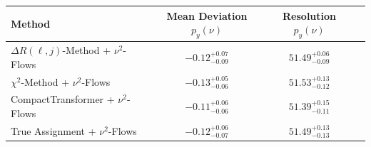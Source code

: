    \begin{tabular}{lccc}
        \toprule
        Method & Mean Deviation $p_{y}(\nu)$ & Resolution $p_{y}(\nu)$ \\
        \midrule
        $\Delta R(\ell,j)$-Method + $\nu^2$-Flows & $-0.12^{+0.07}_{-0.09}$ & $51.49^{+0.06}_{-0.09}$ \\
        $\chi^2$-Method + $\nu^2$-Flows & $-0.13^{+0.05}_{-0.06}$ & $51.53^{+0.13}_{-0.12}$ \\
        CompactTransformer + $\nu^2$-Flows & $-0.11^{+0.06}_{-0.06}$ & $51.39^{+0.15}_{-0.11}$ \\
        True Assignment + $\nu^2$-Flows & $-0.12^{+0.06}_{-0.07}$ & $51.49^{+0.13}_{-0.13}$ \\
        \bottomrule
    \end{tabular}